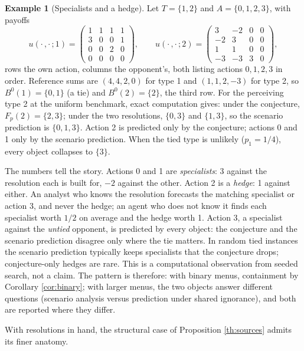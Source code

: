 \documentclass[12pt]{article}
\theoremstyle{definition}
\newtheorem{example}{Example}
\begin{document}
\begin{example}[Specialists and a hedge]\label{ex:hedge}
Let $T = \{1, 2\}$ and $A = \{0, 1, 2, 3\}$, with payoffs
\[
u(\cdot\,, \cdot\,; 1) = \begin{pmatrix} 1&1&1&1 \\ 3&0&0&1 \\ 0&0&2&0 \\ 0&0&0&0 \end{pmatrix},
\qquad
u(\cdot\,, \cdot\,; 2) = \begin{pmatrix} 3&-2&0&0 \\ -2&3&0&0 \\ 1&1&0&0 \\ -3&-3&3&0 \end{pmatrix},
\]
rows the own action, columns the opponent's, both listing actions $0, 1, 2, 3$ in order. Reference sums are $(4,4,2,0)$ for type 1 and $(1,1,2,-3)$ for type 2, so $B^0(1) = \{0,1\}$ (a tie) and $B^0(2) = \{2\}$, the third row. For the perceiving type 2 at the uniform benchmark, exact computation gives: under the conjecture, $F_p(2) = \{2, 3\}$; under the two resolutions, $\{0, 3\}$ and $\{1, 3\}$, so the scenario prediction is $\{0, 1, 3\}$. Action 2 is predicted only by the conjecture; actions 0 and 1 only by the scenario prediction. When the tied type is unlikely ($p_1 = 1/4$), every object collapses to $\{3\}$.
\end{example}

The numbers tell the story. Actions 0 and 1 are \emph{specialists}: 3 against the resolution each is built for, $-2$ against the other. Action 2 is a \emph{hedge}: 1 against either. An analyst who knows the resolution forecasts the matching specialist or action 3, and never the hedge; an agent who does not know it finds each specialist worth $1/2$ on average and the hedge worth 1. Action 3, a specialist against the \emph{untied} opponent, is predicted by every object: the conjecture and the scenario prediction disagree only where the tie matters. In random tied instances the scenario prediction typically keeps specialists that the conjecture drops; conjecture-only hedges are rare. This is a computational observation from seeded search, not a claim. The pattern is therefore: with binary menus, containment by Corollary \ref{cor:binary}; with larger menus, the two objects answer different questions (scenario analysis versus prediction under shared ignorance), and both are reported where they differ.

With resolutions in hand, the structural case of Proposition \ref{th:sources} admits its finer anatomy.
\end{document}
